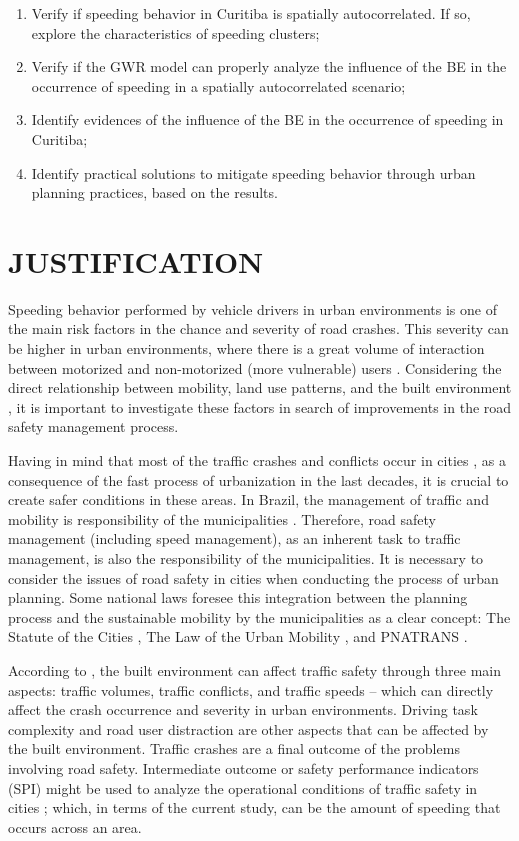 \begin{enumerate}
    \item Verify if speeding behavior in Curitiba is spatially autocorrelated. If so, explore the characteristics of speeding clusters;
    \item Verify if the GWR model can properly analyze the influence of the BE in the occurrence of speeding in a spatially autocorrelated scenario;
    \item Identify evidences of the influence of the BE in the occurrence of speeding in Curitiba;
    \item Identify practical solutions to mitigate speeding behavior through urban planning practices, based on the results. 
\end{enumerate}
    
\section{JUSTIFICATION}

Speeding behavior performed by vehicle drivers in urban environments is one of the main risk factors in the chance and severity of road crashes. This severity can be higher in urban environments, where there is a great volume of interaction between motorized and non-motorized (more vulnerable) users \cite{Elvik2009}. Considering the direct relationship between mobility, land use patterns, and the built environment \cite{DeVos2013}, it is important to investigate these factors in search of improvements in the road safety management process.

Having in mind that most of the traffic crashes and conflicts occur in cities \cite{WHO2018}, as a consequence of the fast process of urbanization in the last decades, it is crucial to create safer conditions in these areas. In Brazil, the management of traffic and mobility is responsibility of the municipalities \cite{Brasil1997}. Therefore, road safety management (including speed management), as an inherent task to traffic management, is also the responsibility of the municipalities. It is necessary to consider the issues of road safety in cities when conducting the process of urban planning. Some national laws foresee this integration between the planning process and the sustainable mobility by the municipalities as a clear concept: The Statute of the Cities \cite{Brasil2001}, The Law of the Urban Mobility \cite{Brasil2012}, and PNATRANS \cite{MinistryofCities2018}.    

According to \textcite{Ewing2009}, the built environment can affect traffic safety through three main aspects: traffic volumes, traffic conflicts, and traffic speeds – which can directly affect the crash occurrence and severity in urban environments. Driving task complexity \cite{Onate-Vega2020} and road user distraction \cite{Chen2021} are other aspects that can be affected by the built environment. Traffic crashes are a final outcome of the problems involving road safety. Intermediate outcome or safety performance indicators (SPI) might be used to analyze the operational conditions of traffic safety in cities \cite{Bastos2014}; which, in terms of the current study, can be the amount of speeding that occurs across an area.

